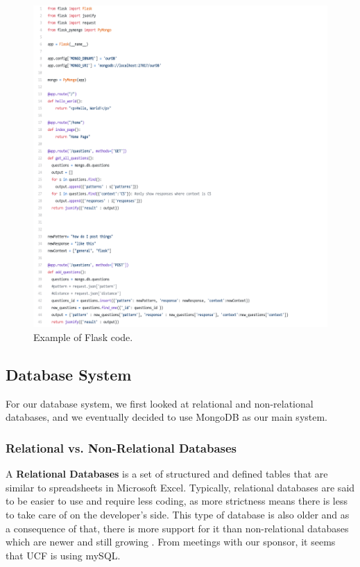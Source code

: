 \documentclass[titlepage, 12pt]{article}
\begin{document}
\begin{figure}[p]
    \centering\includegraphics[width=1\linewidth]{images/flask-example.png}
    \caption{Example of Flask code.}
\end{figure}


\subsection{Database System}

For our database system, we first looked at relational and non-relational databases, and we eventually decided to use MongoDB as our main system.

\subsubsection{Relational vs. Non-Relational Databases}

A \textbf{Relational Databases} is a set of structured and defined tables that are similar to spreadsheets in Microsoft Excel. Typically, relational databases are said to be easier to use and require less coding, as more strictness means there is less to take care of on the developer’s side. This type of database is also older and as a consequence of that, there is more support for it than non-relational databases which are newer and still growing \cite{bib-2-1, bib-2-2}. From meetings with our sponsor, it seems that UCF is using mySQL.
\end{document}
